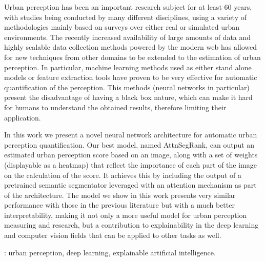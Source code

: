 Urban perception has been an important research subject for at least 60 years, with studies
being conducted by many different disciplines, using a variety of methodologies mainly based
on surveys over either real or simulated urban environments. The recently increased availability
of large amounts of data and highly scalable data collection methods powered by the modern web
has allowed for new techniques from other domains to be extended to the estimation of urban perception.
In particular, machine learning methods used as either stand alone models or feature extraction tools
have proven to be very effective for automatic quantification of the perception. This methods (neural networks in particular) present the disadvantage of having a black box
nature, which can make it hard for humans to understand the obtained results, therefore limiting
their application.

In this work we present a novel neural network architecture for automatic urban perception quantification.
Our best model, named AttnSegRank, can output an estimated urban perception score based on an image,
along with a set of weights (displayable as a heatmap) that reflect the importance of each part of the image
on the calculation of the score. It achieves this by including the output of a pretrained
semantic segmentator leveraged with an attention mechanism as part of the architecture. The model
we show in this work presents very similar performance with those in the previous literature but
with a much better interpretability, making it  not only a more useful model for urban perception
measuring and research, but a contribution to explainability in
the deep learning and computer vision fields that can be applied to other tasks as well.


\vfill
{}:  urban perception, deep learning, explainable artificial intelligence.
